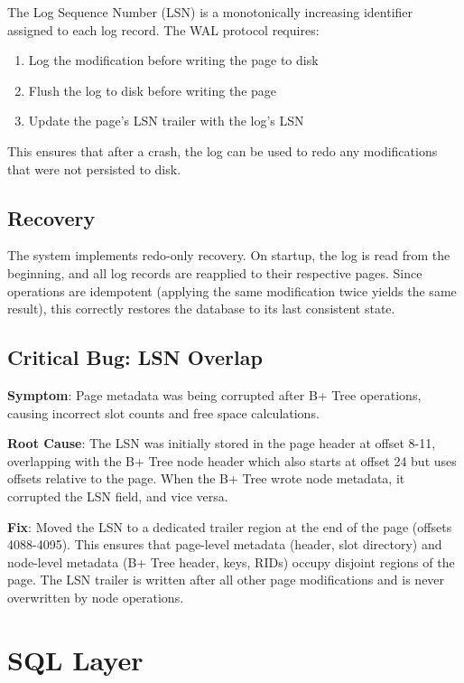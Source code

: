\documentclass{article}
\begin{document}
The Log Sequence Number (LSN) is a monotonically increasing identifier assigned to each log record. The WAL protocol requires:
\begin{enumerate}
    \item Log the modification before writing the page to disk
    \item Flush the log to disk before writing the page
    \item Update the page's LSN trailer with the log's LSN
\end{enumerate}

This ensures that after a crash, the log can be used to redo any modifications that were not persisted to disk.

\subsection{Recovery}

The system implements redo-only recovery. On startup, the log is read from the beginning, and all log records are reapplied to their respective pages. Since operations are idempotent (applying the same modification twice yields the same result), this correctly restores the database to its last consistent state.

\subsection{Critical Bug: LSN Overlap}

\textbf{Symptom}: Page metadata was being corrupted after B+ Tree operations, causing incorrect slot counts and free space calculations.

\textbf{Root Cause}: The LSN was initially stored in the page header at offset 8-11, overlapping with the B+ Tree node header which also starts at offset 24 but uses offsets relative to the page. When the B+ Tree wrote node metadata, it corrupted the LSN field, and vice versa.

\textbf{Fix}: Moved the LSN to a dedicated trailer region at the end of the page (offsets 4088-4095). This ensures that page-level metadata (header, slot directory) and node-level metadata (B+ Tree header, keys, RIDs) occupy disjoint regions of the page. The LSN trailer is written after all other page modifications and is never overwritten by node operations.

\section{SQL Layer}
\end{document}
